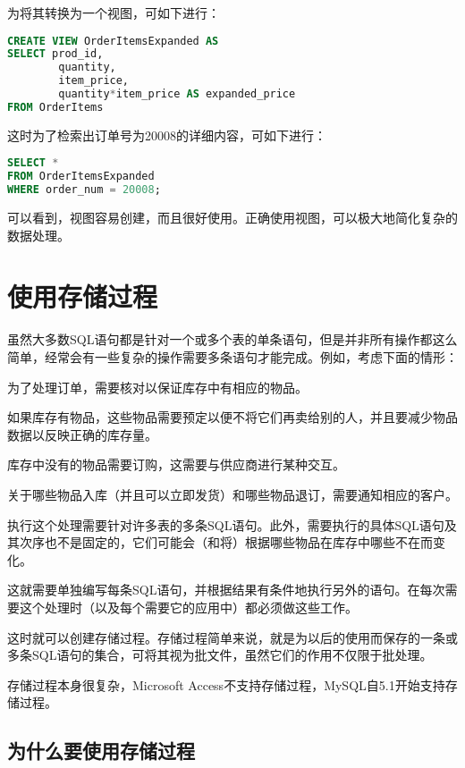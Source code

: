 为将其转换为一个视图，可如下进行：

\begin{lstlisting}[language=SQL]
CREATE VIEW OrderItemsExpanded AS
SELECT prod_id,
		quantity,
		item_price,
		quantity*item_price AS expanded_price
FROM OrderItems
\end{lstlisting}

这时为了检索出订单号为20008的详细内容，可如下进行：

\begin{lstlisting}[language=SQL]
SELECT *
FROM OrderItemsExpanded
WHERE order_num = 20008;
\end{lstlisting}

可以看到，视图容易创建，而且很好使用。正确使用视图，可以极大地简化复杂的数据处理。


\section{使用存储过程}

虽然大多数SQL语句都是针对一个或多个表的单条语句，但是并非所有操作都这么简单，经常会有一些复杂的操作需要多条语句才能完成。例如，考虑下面的情形：

\begin{compactitem}
\item 为了处理订单，需要核对以保证库存中有相应的物品。
\item 如果库存有物品，这些物品需要预定以便不将它们再卖给别的人，并且要减少物品数据以反映正确的库存量。
\item 库存中没有的物品需要订购，这需要与供应商进行某种交互。
\item 关于哪些物品入库（并且可以立即发货）和哪些物品退订，需要通知相应的客户。
\end{compactitem}

执行这个处理需要针对许多表的多条SQL语句。此外，需要执行的具体SQL语句及其次序也不是固定的，它们可能会（和将）根据哪些物品在库存中哪些不在而变化。

这就需要单独编写每条SQL语句，并根据结果有条件地执行另外的语句。在每次需要这个处理时（以及每个需要它的应用中）都必须做这些工作。

这时就可以创建存储过程。存储过程简单来说，就是为以后的使用而保存的一条或多条SQL语句的集合，可将其视为批文件，虽然它们的作用不仅限于批处理。

存储过程本身很复杂，Microsoft Access不支持存储过程，MySQL自5.1开始支持存储过程。

\subsection{为什么要使用存储过程}

